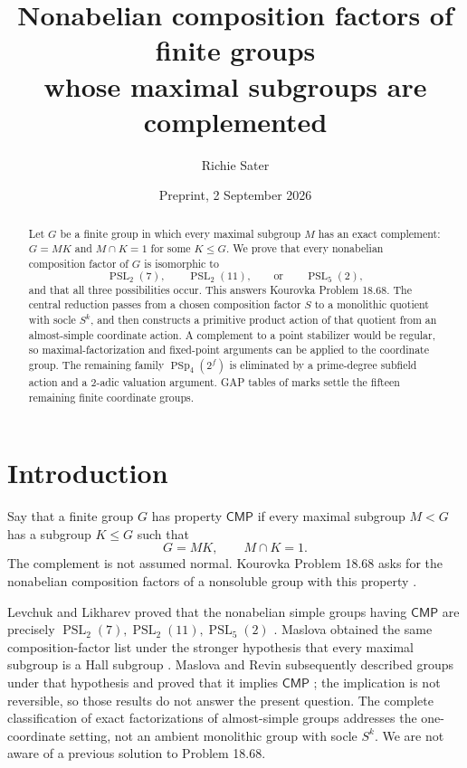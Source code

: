 \documentclass[11pt]{amsart}
\title[Complemented maximal subgroups]{Nonabelian composition factors of finite groups\\
whose maximal subgroups are complemented}
\author{Richie Sater}
\date{Preprint, 2 September 2026}
\newcommand{\CMP}{\mathsf{CMP}}
\newcommand{\PSL}{\operatorname{PSL}}
\newcommand{\PSp}{\operatorname{PSp}}
\theoremstyle{definition}
\begin{document}
\raggedbottom

\begin{abstract}
Let \(G\) be a finite group in which every maximal subgroup \(M\) has an
exact complement: \(G=MK\) and \(M\cap K=1\) for some \(K\leq G\).  We prove
that every nonabelian composition factor of \(G\) is isomorphic to
\[
\PSL_2(7),\qquad \PSL_2(11),\qquad\text{or}\qquad \PSL_5(2),
\]
and that all three possibilities occur.  This answers Kourovka Problem
18.68.  The central reduction passes from a chosen composition factor \(S\)
to a monolithic quotient with socle \(S^k\), and then constructs a primitive
product action of that quotient from an almost-simple coordinate action.
A complement to a point stabilizer would be regular, so maximal-factorization
and fixed-point arguments can be applied to the coordinate group.  The
remaining family \(\PSp_4(2^f)\) is eliminated by a prime-degree subfield
action and a 2-adic valuation argument.  GAP tables of marks settle the
fifteen remaining finite coordinate groups.
\end{abstract}

\maketitle
\enlargethispage{2pt}

\section{Introduction}\label{sec:introduction}

Say that a finite group \(G\) has property \(\CMP\) if every maximal subgroup
\(M<G\) has a subgroup \(K\leq G\) such that
\begin{equation}\label{eq:complement}
G=MK,\qquad M\cap K=1.
\end{equation}
The complement is not assumed normal.  Kourovka Problem 18.68 asks for the
nonabelian composition factors of a nonsoluble group with this property
\cite[Problem 18.68]{kourovka21}.

Levchuk and Likharev proved that the nonabelian simple groups having
\(\CMP\) are precisely \(\PSL_2(7),\PSL_2(11),\PSL_5(2)\)
\cite[Theorem 1 and Lemmas 4, 6]{levchuk-likharev}.  Maslova obtained the same
composition-factor list under the stronger hypothesis that every maximal
subgroup is a Hall subgroup \cite[Theorem 1]{maslova-hall-factors}.  Maslova
and Revin subsequently described groups under that hypothesis and proved
that it implies \(\CMP\) \cite[Theorems 1--2]{maslova-revin}; the implication
is not reversible, so those results do not answer the present question.  The
complete classification of exact factorizations of almost-simple groups
\cite{li-wang-xia} addresses the one-coordinate setting, not an ambient
monolithic group with socle \(S^k\). We are not aware of a previous solution
to Problem 18.68.
\end{document}
